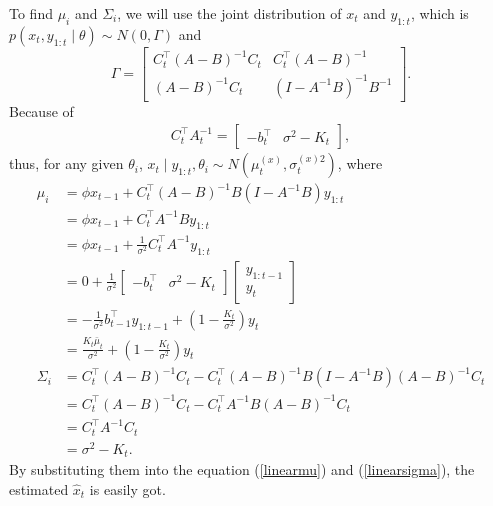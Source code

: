 To find $\mu_i$ and $\Sigma_i$, we will use the joint distribution of $x_{t}$ and $y_{1:t}$, which is $p\left(x_{t}, y_{1:t}  \mid  \theta\right)\sim N\left(0,\Gamma\right)$ and 
\begin{equation*}
\Gamma=\begin{bmatrix} C_{t}^\top\left(A-B\right)^{-1}C_{t} & C_{t}^\top\left(A-B\right)^{-1}\\\left(A-B\right)^{-1}C_{t} & \left(I-A^{-1}B\right)^{-1}B^{-1} \end{bmatrix}.
\end{equation*}
Because of 
\begin{align*}
C_{t}^\top A_{t}^{-1} = \left[\begin{matrix} - b_{t}^\top & \sigma^2- K_{t} \end{matrix} \right],
\end{align*}
thus, for any given $\theta_i$, $x_{t}\mid y_{1:t},\theta_i \sim N\left(\mu_{t}^{\left(x\right)},\sigma_{t}^{\left(x\right)2}\right)$, where
\begin{align*}
\mu_i  &= \phi \hat{x}_{t-1} +  C_{t}^\top \left(A-B\right)^{-1}B \left(I-A^{-1}B\right)y_{1:t}\\
                      &= \phi \hat{x}_{t-1} +  C_{t}^\top A^{-1}B y_{1:t} \\ &= \phi \hat{x}_{t-1} +  \frac{1}{\sigma^2}C_{t}^\top A^{-1} y_{1:t}\\
                      &=0+  \frac{1}{\sigma^2}\left[\begin{matrix} - b_{t}^\top & \sigma^2- K_{t} \end{matrix} \right]  \left[\begin{matrix} y_{1:t-1} \\ y_{t} \end{matrix} \right] \\
                      &= - \frac{1}{\sigma^2}b_{t-1}^\top y_{1:t-1}+\left(1-\frac{K_{t}}{\sigma^2}\right)y_{t}\\
                      &=\frac{K_{t}\bar{\mu}_{t}}{\sigma^2}+\left(1-\frac{K_{t}}{\sigma^2}\right)y_{t} \\
\Sigma_i&=C_{t}^\top\left(A-B\right)^{-1}C_{t}-  C_{t}^\top\left(A-B\right)^{-1}  B\left(I-A^{-1}B\right) \left(A-B\right)^{-1}C_{t}\\
                      &= C_{t}^\top\left(A-B\right)^{-1}C_{t} -  C_{t}^\top A^{-1}B\left(A-B\right)^{-1}C_{t}\\
                      &= C_{t}^\top A^{-1}C_{t} \\ &= \sigma^2-K_{t}.
\end{align*}
By substituting them into the equation (\ref{linearmu}) and (\ref{linearsigma}), the estimated $\hat{x}_t$ is easily got. 



